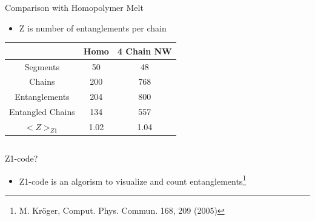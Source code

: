 \documentclass[12pt, dvipdfmx]{beamer}
\begin{document}
\begin{frame}
\begin{columns}[onlytextwidth][c]
            \begin{block}{Comparison with Homopolymer Melt}
                \begin{itemize}
                    \item Z is number of entanglements per chain
                \end{itemize}
                \scriptsize
                \begin{center}
                    \begin{tabular}{c||c|c} \hline
                        &Homo & 4 Chain NW \\ \hline \hline
                        Segments& 50& 48 \\ \hline
                        Chains & 200& 768 \\ \hline
                        Entanglements& 204& 800\\ \hline
                        Entangled Chains&134&557 \\ \hline
                        \alert{$<Z>_{Z1}$}&\alert{1.02}& \alert{1.04}\\ \hline
                    \end{tabular}
                \end{center}
            \end{block}
        \end{columns}
    \begin{alertblock}{Z1-code?}
        \begin{itemize}
            \item Z1-code is an algorism to visualize and count entanglements\footnote{
                M. Kröger, Comput. Phys. Commun. 168, 209 (2005)
            }
        \end{itemize}
    \end{alertblock}
\end{frame}
\end{document}
